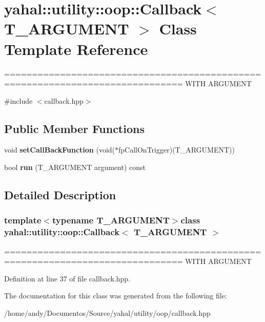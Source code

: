 \hypertarget{classyahal_1_1utility_1_1oop_1_1_callback}{}\section{yahal\+:\+:utility\+:\+:oop\+:\+:Callback$<$ T\+\_\+\+A\+R\+G\+U\+M\+E\+N\+T $>$ Class Template Reference}
\label{classyahal_1_1utility_1_1oop_1_1_callback}


============================================================================== W\+I\+T\+H A\+R\+G\+U\+M\+E\+N\+T  




{\ttfamily \#include $<$callback.\+hpp$>$}

\subsection*{Public Member Functions}
\begin{DoxyCompactItemize}
\item 
\hypertarget{classyahal_1_1utility_1_1oop_1_1_callback_a98bf2f87baa4b37ca913d87b299739fd}{}void {\bfseries set\+Call\+Back\+Function} (void($\ast$fp\+Call\+On\+Trigger)(T\+\_\+\+A\+R\+G\+U\+M\+E\+N\+T))\label{classyahal_1_1utility_1_1oop_1_1_callback_a98bf2f87baa4b37ca913d87b299739fd}

\item 
\hypertarget{classyahal_1_1utility_1_1oop_1_1_callback_adca95cbca0615399bac9ae47b3891c96}{}bool {\bfseries run} (T\+\_\+\+A\+R\+G\+U\+M\+E\+N\+T argument) const \label{classyahal_1_1utility_1_1oop_1_1_callback_adca95cbca0615399bac9ae47b3891c96}

\end{DoxyCompactItemize}


\subsection{Detailed Description}
\subsubsection*{template$<$typename T\+\_\+\+A\+R\+G\+U\+M\+E\+N\+T$>$class yahal\+::utility\+::oop\+::\+Callback$<$ T\+\_\+\+A\+R\+G\+U\+M\+E\+N\+T $>$}

============================================================================== W\+I\+T\+H A\+R\+G\+U\+M\+E\+N\+T 

Definition at line 37 of file callback.\+hpp.



The documentation for this class was generated from the following file\+:\begin{DoxyCompactItemize}
\item 
/home/andy/\+Documentos/\+Source/yahal/utility/oop/callback.\+hpp\end{DoxyCompactItemize}
